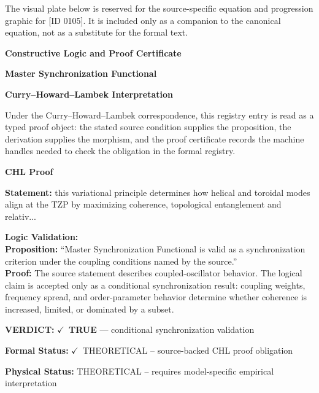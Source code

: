 \begingroup\footnotesize\sloppy
The visual plate below is reserved for the source-specific equation and progression graphic for [ID 0105]. It is included only as a companion to the canonical equation, not as a substitute for the formal text.
\par\endgroup
\ifTZPDarkEdition
{}
\fi

\clearpage
\begingroup\tzpsupportsetup
\noindent\textbf{\fontsize{10.8pt}{12.8pt}\selectfont [ID 0105] Constructive Logic and Proof Certificate}\par
\noindent\textbf{\fontsize{10pt}{12pt}\selectfont Master Synchronization Functional}\par
\vspace{0.45em}
\begingroup
\footnotesize
\setlength{\parskip}{0.22em}
\setlength{\parindent}{0pt}
\noindent\textbf{Curry--Howard--Lambek Interpretation}\par
Under the Curry--Howard--Lambek correspondence, this registry entry is read as a typed proof
object: the stated source condition supplies the proposition, the derivation supplies the
morphism, and the proof certificate records the machine handles needed to check the obligation
in the formal registry.

\vspace{0.45em}
\noindent\textbf{CHL Proof}\par
\textbf{Statement:} this variational principle determines how helical and toroidal modes align at the TZP by
maximizing coherence, topological entanglement and relativ...

\textbf{Logic Validation:}\\
\textbf{Proposition:} ``Master Synchronization Functional is valid as a synchronization criterion under the
coupling conditions named by the source.''\\
\textbf{Proof:} The source statement describes coupled-oscillator behavior. The logical claim is
accepted only as a conditional synchronization result: coupling weights, frequency
spread, and order-parameter behavior determine whether coherence is increased, limited,
or dominated by a subset.

\textbf{VERDICT:} \ensuremath{\checkmark}\ \textbf{TRUE} --- conditional synchronization validation

\textbf{Formal Status:} \ensuremath{\checkmark}\ THEORETICAL -- source-backed CHL proof obligation

\textbf{Physical Status:} THEORETICAL -- requires model-specific empirical interpretation
\par\vspace{0.45em}
\par
\ifTZPDarkEdition
{}
\fi
\endgroup
\endgroup
